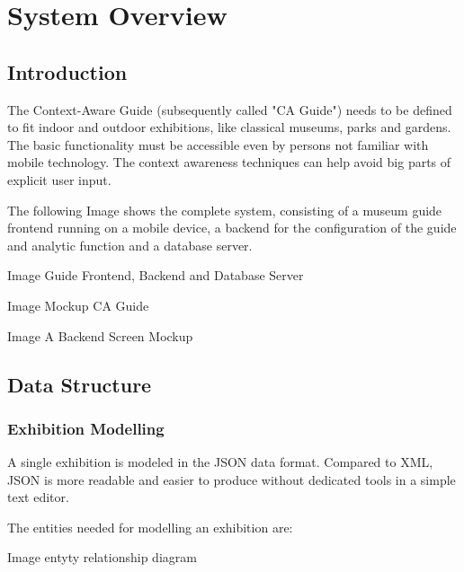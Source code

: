 
\chapter{System Overview} %

\label{systemoverview} %



\section{Introduction}

The Context-Aware Guide (subsequently called "CA Guide") needs to be defined to fit indoor and outdoor exhibitions, like classical museums, parks and gardens. 
The basic functionality must be accessible even by persons not familiar with mobile technology. The context awareness techniques can help avoid big parts of explicit user input.

The following Image shows the complete system, consisting of a museum guide frontend running on a mobile device, a backend for the configuration of the guide and analytic function and a database server.

Image Guide Frontend, Backend and Database Server

Image Mockup CA Guide 

Image A Backend Screen Mockup

\section{Data Structure}

\subsection{Exhibition Modelling}

A single exhibition is modeled in the JSON data format. Compared to XML, JSON is more readable and easier to produce without dedicated tools in a simple text editor.

The entities needed for modelling an exhibition are:

Image entyty relationship diagram

